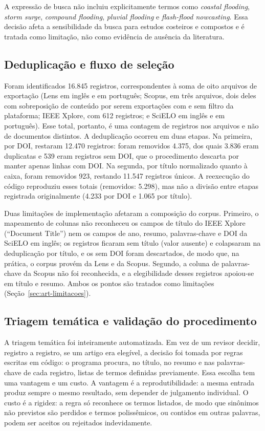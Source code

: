 A expressão de busca não incluiu explicitamente termos como \textit{coastal flooding}, \textit{storm surge}, \textit{compound flooding}, \textit{pluvial flooding} e \textit{flash-flood nowcasting}. Essa decisão afeta a sensibilidade da busca para estudos costeiros e compostos e é tratada como limitação, não como evidência de ausência da literatura.

\subsection{Deduplicação e fluxo de seleção}

Foram identificados 16.845 registros, correspondentes à soma de oito arquivos de exportação (Lens em inglês e em português; Scopus, em três arquivos, dois deles com sobreposição de conteúdo por serem exportações com e sem filtro da plataforma; IEEE Xplore, com 612 registros; e SciELO em inglês e em português). Esse total, portanto, é uma contagem de registros nos arquivos e não de documentos distintos. A deduplicação ocorreu em duas etapas. Na primeira, por DOI, restaram 12.470 registros: foram removidos 4.375, dos quais 3.836 eram duplicatas e 539 eram registros sem DOI, que o procedimento descarta por manter apenas linhas com DOI. Na segunda, por título normalizado quanto à caixa, foram removidos 923, restando 11.547 registros únicos. A reexecução do código reproduziu esses totais (removidos: 5.298), mas não a divisão entre etapas registrada originalmente (4.233 por DOI e 1.065 por título).

Duas limitações de implementação afetaram a composição do corpus. Primeiro, o mapeamento de colunas não reconheceu os campos de título do IEEE Xplore (``Document Title'') nem os campos de ano, resumo, palavras-chave e DOI da SciELO em inglês; os registros ficaram sem título (valor ausente) e colapsaram na deduplicação por título, e os sem DOI foram descartados, de modo que, na prática, o corpus provém da Lens e da Scopus. Segundo, a coluna de palavras-chave da Scopus não foi reconhecida, e a elegibilidade desses registros apoiou-se em título e resumo. Ambos os pontos são tratados como limitações (Seção~\ref{sec:art-limitacoes}).

\subsection{Triagem temática e validação do procedimento}
\label{sec:art-triagem}

A triagem temática foi inteiramente automatizada. Em vez de um revisor decidir, registro a registro, se um artigo era elegível, a decisão foi tomada por regras escritas em código: o programa procura, no título, no resumo e nas palavras-chave de cada registro, listas de termos definidas previamente. Essa escolha tem uma vantagem e um custo. A vantagem é a reprodutibilidade: a mesma entrada produz sempre o mesmo resultado, sem depender de julgamento individual. O custo é a rigidez: a regra só reconhece os termos listados, de modo que sinônimos não previstos são perdidos e termos polissêmicos, ou contidos em outras palavras, podem ser aceitos ou rejeitados indevidamente.

